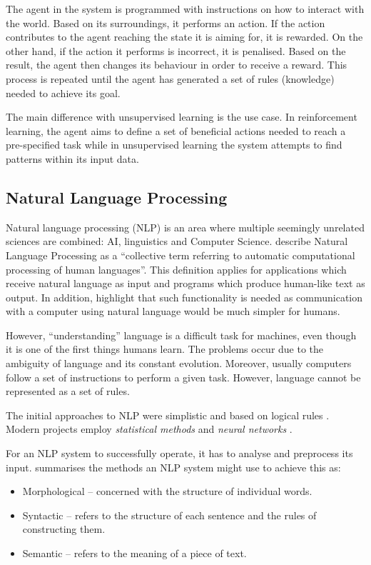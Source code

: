 \documentclass[12pt,a4paper]{article}
\begin{document}
The agent in the system is programmed with instructions on how to interact with the world. Based on its surroundings, it performs an action. If the action contributes to the agent reaching the state it is aiming for, it is rewarded. On the other hand, if the action it performs is incorrect, it is penalised. Based on the result, the agent then changes its behaviour in order to receive a reward. This process is repeated until the agent has generated a set of rules (knowledge) needed to achieve its goal.

The main difference with unsupervised learning is the use case. In reinforcement learning, the agent aims to define a set of beneficial actions needed to reach a pre-specified task while in unsupervised learning the system attempts to find patterns within its input data.

\subsection{Natural Language Processing}
Natural language processing (NLP) is an area where multiple seemingly unrelated sciences are combined: AI, linguistics and Computer Science. \citet[17]{Goldberg2017} describe Natural Language Processing as a \enquote{collective term referring to automatic computational processing of human languages}. This definition applies for applications which receive natural language as input and programs which produce human-like text as output. In addition, \citet[17]{Goldberg2017} highlight that such functionality is needed as communication with a computer using natural language would be much simpler for humans. 

However, \enquote{understanding} language is a difficult task for machines, even though it is one of the first things humans learn. The problems occur due to the ambiguity of language and its constant evolution. Moreover, usually computers follow a set of instructions to perform a given task. However, language cannot be represented as a set of rules.

The initial approaches to NLP were simplistic and based on logical rules . Modern projects employ \textit{statistical methods} and \textit{neural networks} \citep{Goldberg2015}.

For an NLP system to successfully operate, it has to analyse and preprocess its input. \citet{Martinez2010} summarises the methods an NLP system might use to achieve this as:
\begin{itemize}
	\item Morphological – concerned with the structure of individual words.
	\item Syntactic – refers to the structure of each sentence and the rules of constructing them.
	\item Semantic – refers to the meaning of a piece of text.
\end{itemize}
\end{document}
